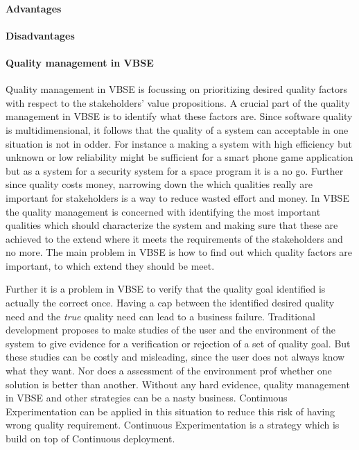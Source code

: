 \documentclass{sig-alternate}
\begin{document}
\paragraph{Advantages}
\paragraph{Disadvantages}

\paragraph{Quality management in VBSE}
Quality management in VBSE is focussing on prioritizing desired quality factors with respect to the stakeholders' value propositions. A crucial part of the quality management in VBSE is to identify what these factors are. Since software quality is multidimensional, it follows that the quality of a system can acceptable in one situation is not in odder. For instance a making a system with high efficiency but unknown or low reliability might be sufficient for a smart phone game application but as a system for a security system for a space program it is a no go. Further since quality costs money, narrowing down the which qualities really are important for stakeholders is a way to reduce wasted effort and money. In VBSE the quality management is concerned with identifying the most important qualities which should characterize the system and making sure that these are achieved to the extend where it meets the requirements of the stakeholders and no more. 
The main problem in VBSE is how to find out which quality factors are important, to which extend they should be meet. 

Further it is a problem in VBSE to verify that the quality goal identified is actually the correct once. Having a cap between the identified desired quality need and the \textit{true} quality need can lead to a business failure. 
Traditional development proposes to make studies of the user and the environment of the system to give evidence for a verification or rejection of a set of quality goal. But these studies can be costly and misleading, since the user does not always know what they want. Nor does a assessment of the environment prof whether one solution is better than another. Without any hard evidence, quality management in VBSE and other strategies can be a nasty business. Continuous Experimentation can be applied in this situation to reduce this risk of having wrong quality requirement. 
Continuous Experimentation is a strategy which is build on top of Continuous deployment.  
\end{document}

